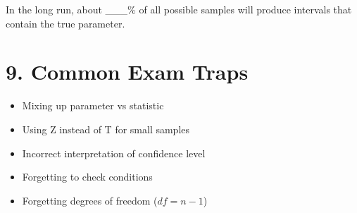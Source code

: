 \documentclass[11pt]{article}
\begin{document}
In the long run, about \_\_\_\% of all possible samples will produce intervals that contain the true parameter.

\section*{9. Common Exam Traps}

\begin{itemize}
    \item Mixing up parameter vs statistic
    \item Using Z instead of T for small samples
    \item Incorrect interpretation of confidence level
    \item Forgetting to check conditions
    \item Forgetting degrees of freedom ($df=n-1$)
\end{itemize}
\end{document}
